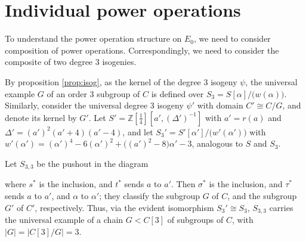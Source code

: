 \documentclass{gtpart}
\theoremstyle{definition}
\theoremstyle{remark}
\newcommand{\mb}[1]{\mathbb{#1}}
\newcommand{\BZ}{{\mb Z}}
\newcommand{\A}{\alpha}
\begin{document}
\section{Individual power operations}
\label{sec:Gamma}

To understand the power operation structure on $E_0$, 
we need to consider composition of power operations.  
Correspondingly, we need to consider the composite of two degree 3 isogenies.  

By proposition \ref{prop:isog}, as the kernel of the degree 3 isogeny $\psi$, 
the universal example $G$ of an order 3 subgroup of $C$ is defined over 
$S_3 = S[\A] \big/ \big( w(\A) \big)$.  
Similarly, consider the universal degree 3 isogeny $\psi'$ with domain 
$C' \cong C/G$, and denote its kernel by $G'$.  
Let $S' = \BZ [\frac{1}{4}] [a', (\Delta')^{-1}]$ with $a' = r(a)$ and $\Delta' = (a')^2 (a' + 4) (a' - 4)$, 
and let $S_3' = S'[\A'] \big/ \big( w'(\A') \big)$ with $w'(\A') = (\A')^4 - 6 (\A')^2 + \big( (a')^2 - 8 \big) \A' - 3$, analogous to $S$ and $S_3$.  

Let $S_{3,3}$ be the pushout in the diagram 
\begin{center}
\end{center}
where $s^*$ is the inclusion, and $t^*$ sends $a$ to $a'$.  
Then $\sigma^*$ is the inclusion, and $\tau^*$ sends $a$ to $a'$, and $\A$ to $\A'$; 
they classify the subgroup $G$ of $C$, and the subgroup $G'$ of $C'$, respectively.  
Thus, via the evident isomorphism $S_3' \cong S_3$, 
$S_{3,3}$ carries the universal example of a chain $G < C[3]$ of subgroups of $C$, 
with $|G| = |C[3]/G| = 3$.  
\end{document}
